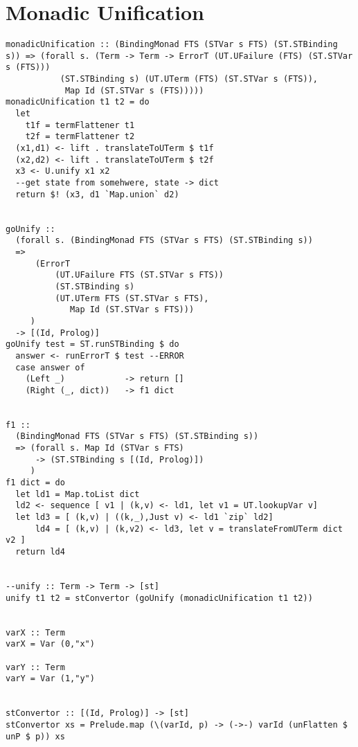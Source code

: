 \documentclass[thesis-solanki.tex]{files}
\begin{document}
\section{Monadic Unification}
\begin{verbatim}
monadicUnification :: (BindingMonad FTS (STVar s FTS) (ST.STBinding s)) => (forall s. (Term -> Term -> ErrorT (UT.UFailure (FTS) (ST.STVar s (FTS)))
           (ST.STBinding s) (UT.UTerm (FTS) (ST.STVar s (FTS)),
            Map Id (ST.STVar s (FTS)))))
monadicUnification t1 t2 = do
  let
    t1f = termFlattener t1
    t2f = termFlattener t2
  (x1,d1) <- lift . translateToUTerm $ t1f
  (x2,d2) <- lift . translateToUTerm $ t2f
  x3 <- U.unify x1 x2
  --get state from somehwere, state -> dict
  return $! (x3, d1 `Map.union` d2)


goUnify ::
  (forall s. (BindingMonad FTS (STVar s FTS) (ST.STBinding s))
  =>
      (ErrorT
          (UT.UFailure FTS (ST.STVar s FTS))
          (ST.STBinding s)
          (UT.UTerm FTS (ST.STVar s FTS),
             Map Id (ST.STVar s FTS)))
     )
  -> [(Id, Prolog)]
goUnify test = ST.runSTBinding $ do
  answer <- runErrorT $ test --ERROR
  case answer of
    (Left _)            -> return []
    (Right (_, dict))   -> f1 dict


f1 ::
  (BindingMonad FTS (STVar s FTS) (ST.STBinding s))
  => (forall s. Map Id (STVar s FTS)
      -> (ST.STBinding s [(Id, Prolog)])
     )
f1 dict = do
  let ld1 = Map.toList dict
  ld2 <- sequence [ v1 | (k,v) <- ld1, let v1 = UT.lookupVar v]
  let ld3 = [ (k,v) | ((k,_),Just v) <- ld1 `zip` ld2]
      ld4 = [ (k,v) | (k,v2) <- ld3, let v = translateFromUTerm dict v2 ]
  return ld4


--unify :: Term -> Term -> [st]
unify t1 t2 = stConvertor (goUnify (monadicUnification t1 t2))


varX :: Term
varX = Var (0,"x")

varY :: Term
varY = Var (1,"y")


stConvertor :: [(Id, Prolog)] -> [st]
stConvertor xs = Prelude.map (\(varId, p) -> (->-) varId (unFlatten $ unP $ p)) xs 
\end{verbatim}
\end{document}
